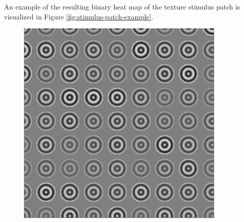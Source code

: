 An example of the resulting binary heat map of the texture stimulus patch is visualized in Figure \ref{fig:stimulus-patch-example}.

\begin{figure}[!htp]
    \centering
    \hfill
    \begin{minipage}[t]{0.45\textwidth}
        \centering
        \includegraphics[width=0.9\textwidth]{assets/images/stimulus-patch.png}
        \label{fig:stimulus-patch-example}
    \end{minipage}
    \hfill
    \begin{minipage}[t]{0.45\textwidth}
        \centering
        
        \label{fig:patch-lattice-example}
    \end{minipage}
    \hfill
\end{figure}






